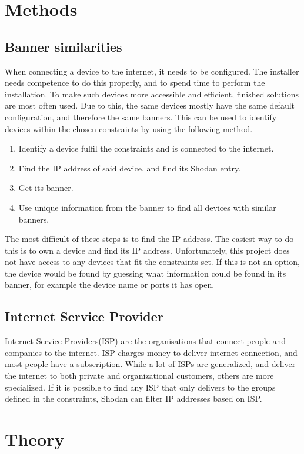 \section{Methods}


\subsection{Banner similarities}
When connecting a device to the internet, it needs to be configured. The installer needs competence to do this properly, and to spend time to perform the installation. To make such devices more accessible and efficient, finished solutions are most often used. Due to this, the same devices mostly have the same default configuration, and therefore the same banners. This can be used to identify devices within the chosen constraints by using the following method.
\begin{enumerate}
    \item Identify a device fulfil the constraints and is connected to the internet.
    \item Find the IP address of said device, and find its Shodan entry.
    \item Get its banner.
    \item Use unique information from the banner to find all devices with similar banners.
\end{enumerate}
The most difficult of these steps is to find the IP address. The easiest way to do this is to own a device and find its IP address. Unfortunately, this project does not have access to any devices that fit the constraints set.
If this is not an option, the device would be found by guessing what information could be found in its banner, for example the device name or ports it has open.

\subsection{Internet Service Provider} \label{sec:isp_method}
Internet Service Providers(ISP) are the organisations that connect people and companies to the internet. ISP charges money to deliver internet connection, and most people have a subscription. While a lot of ISPs are generalized, and deliver the internet to both private and organizational customers, others are more specialized. If it is possible to find any ISP that only delivers to the groups defined in the constraints, Shodan can filter IP addresses based on ISP.

\section{Theory}

